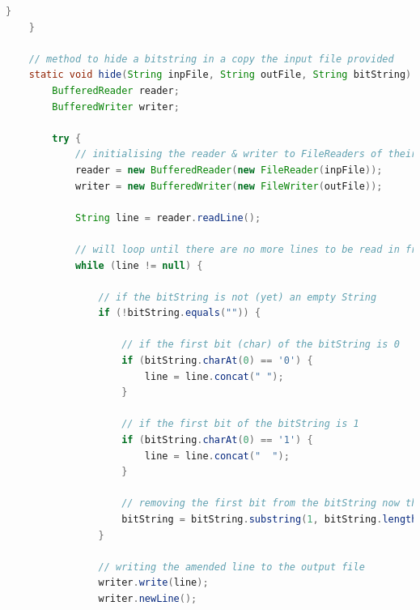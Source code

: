 \documentclass[a4paper]{article}
\begin{document}
\begin{lstlisting}[language=Java]
        } 
    }
   
    // method to hide a bitstring in a copy the input file provided
    static void hide(String inpFile, String outFile, String bitString) {
        BufferedReader reader;                                                  // declaring a BufferedReader for the input file 
        BufferedWriter writer;                                                  // declaring a BufferedWriter for the output file
	
        try {
            // initialising the reader & writer to FileReaders of their respective files (inpFile & outFile)
            reader = new BufferedReader(new FileReader(inpFile));       
            writer = new BufferedWriter(new FileWriter(outFile));
            
            String line = reader.readLine();                                    // reading in the first line from the input file
            
            // will loop until there are no more lines to be read in from the input file (inpFile)
            while (line != null) {
               
                // if the bitString is not (yet) an empty String
                if (!bitString.equals("")) {

                    // if the first bit (char) of the bitString is 0
                    if (bitString.charAt(0) == '0') {                           // note: must use '' instead of "" for char literals
                        line = line.concat(" ");                                // concatenating a space to the end of the line (one space represents a 0)
                    }  
                    
                    // if the first bit of the bitString is 1
                    if (bitString.charAt(0) == '1') {
                        line = line.concat("  ");                               // concatenating two spaces to the end of the line (two spaces represents a 1)
                    }

                    // removing the first bit from the bitString now that it has been used
                    bitString = bitString.substring(1, bitString.length());     // replacing bitString with it's substring that goes from the second character to the last character
                }

                // writing the amended line to the output file
                writer.write(line);
                writer.newLine();


\end{lstlisting}
\end{document}

